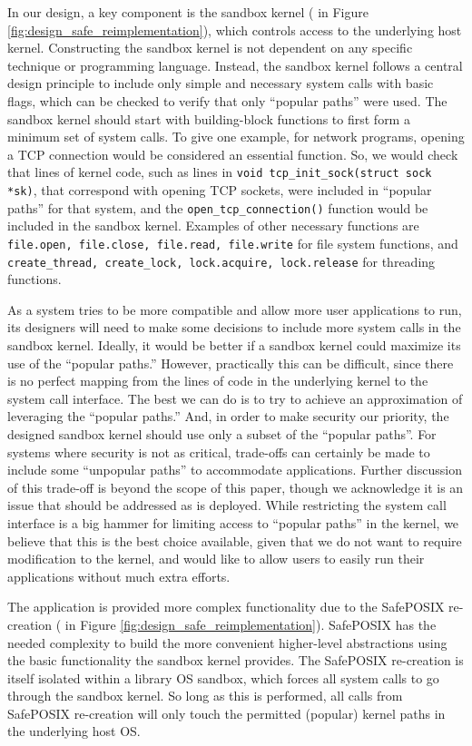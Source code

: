 In our \lip design, a key component is the sandbox kernel ( in Figure \ref{fig:design_safe_reimplementation}), 
which controls access to the underlying host kernel. 
Constructing the sandbox kernel is not dependent on any specific technique or programming language. 
Instead, the sandbox kernel follows a central design principle to include only simple and necessary system calls with basic flags, 
which can be checked to verify that only ``popular paths'' were used.  
The sandbox kernel should start with building-block functions to first form a minimum set of system calls. 
To give one example, for network programs, opening a TCP connection would be considered an essential function. 
So, we would check that lines of kernel code, such as lines in \texttt{void tcp\_init\_sock(struct sock *sk)}, that correspond 
with opening TCP sockets, were included in ``popular paths'' for that system, and the \texttt{open\_tcp\_connection()} function 
would be included in the sandbox kernel. 
Examples of other necessary functions are \texttt{file.open, file.close, file.read, file.write} for file system 
functions, and \texttt{create\_thread, create\_lock, lock.acquire, lock.release} for threading functions. 

As a system tries to be more compatible and allow more user applications to run, 
its designers will need to make some decisions to include more system calls in the sandbox kernel. 
Ideally, it would be better if a sandbox kernel could maximize its use of the ``popular paths.'' 
However, practically this can be difficult, since there is no perfect mapping from the lines of code in the underlying kernel to the 
system call interface. The best we can do is to try to achieve an approximation of leveraging the ``popular paths.'' 
And, in order to make security our priority, the designed sandbox kernel should use only a subset of the ``popular paths''. 
For systems where security is not as critical, trade-offs can certainly be made to include some ``unpopular paths'' to accommodate applications. 
Further discussion of this trade-off is beyond the scope of this paper, 
though we acknowledge it is an issue that should be addressed as \lip is deployed. 
While restricting the system call interface is a big hammer for limiting access to ``popular paths'' in the kernel, 
we believe that this is the best choice available, given that we do not want to require modification to the kernel, and 
would like to allow users to easily run their applications without much extra efforts. 

The application is provided more complex functionality due to the SafePOSIX re-creation
( in Figure \ref{fig:design_safe_reimplementation}).
SafePOSIX has the needed complexity to build the more convenient higher-level
abstractions using the basic functionality the sandbox kernel provides.
The SafePOSIX re-creation is itself isolated within a library OS sandbox, which
forces all system calls to go through the sandbox kernel.
So long as this is performed, all calls from SafePOSIX re-creation will only touch the permitted (popular) kernel paths in the underlying host OS.

